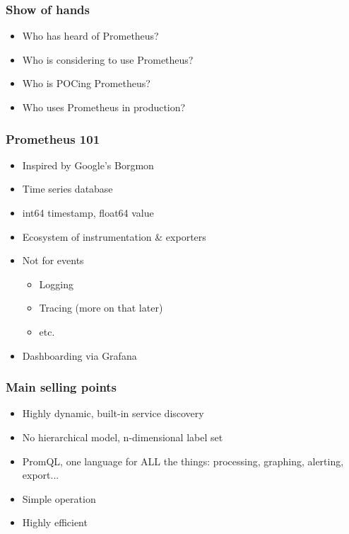 \documentclass[aspectratio=169]{beamer}
\begin{document}



\begin{frame}
	\frametitle{Show of hands}
	\begin{itemize}
		\item Who has heard of Prometheus?
		\item Who is considering to use Prometheus?
		\item Who is POCing Prometheus?
		\item Who uses Prometheus in production?
	\end{itemize}
\end{frame}

\begin{frame}
	\frametitle{Prometheus 101}
	\begin{itemize}
		\item Inspired by Google's Borgmon
		\item Time series database
		\item int64 timestamp, float64 value
		\item Ecosystem of instrumentation \& exporters
		\item Not for events
		\begin{itemize}
			\item Logging
			\item Tracing (more on that later)
			\item etc.
		\end{itemize}
		\item Dashboarding via Grafana
	\end{itemize}
\end{frame}

\begin{frame}
	\frametitle{Main selling points}
	\begin{itemize}
		\item Highly dynamic, built-in service discovery
		\item No hierarchical model, n-dimensional label set
		\item PromQL, one language for ALL the things: processing, graphing, alerting, export...
		\item Simple operation
		\item Highly efficient
	\end{itemize}
\end{frame}
\end{document}
